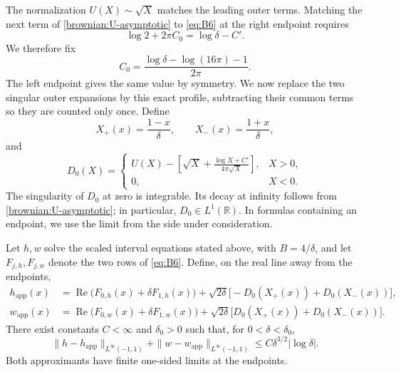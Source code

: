 The normalization $U(X)\sim\sqrt X$ matches the leading outer terms.
Matching the next term of \eqref{brownian:U-asymptotic} to
\eqref{eq:B6} at the right endpoint requires
\[
 \log2+2\pi C_0=\log\delta-C'.
\]
We therefore fix
\[
 C_0=\frac{\log\delta-\log(16\pi)-1}{2\pi}.
\]
The left endpoint gives the same value by symmetry.  We now replace the
two singular outer expansions by this exact profile, subtracting their
common terms so they are counted only once.  Define
\[
 X_+(x)=\frac{1-x}{\delta},\qquad
 X_-(x)=\frac{1+x}{\delta},
\]
and
\[
 D_0(X)=
 \begin{cases}
 U(X)-\displaystyle\left[\sqrt X+
              \frac{\log X+C'}{4\pi\sqrt X}\right],&X>0,\\[6pt]
 0,&X<0.
 \end{cases}
\]
The singularity of $D_0$ at zero is integrable.  Its decay at infinity
follows from \eqref{brownian:U-asymptotic}; in particular,
$D_0\in L^1(\mathbb R)$.  In formulas containing an endpoint,
we use the limit from the side under consideration.

\begin{lemma}\label{brownian:uniform}
Let $h,w$ solve the scaled interval equations stated above, with
$B=4/\delta$, and let $F_{j,h},F_{j,w}$ denote the two rows of
\eqref{eq:B6}.  Define, on the real line away from the endpoints,
\begin{align*}
 h_{\mathrm{app}}(x)
  &=\operatorname{Re}\bigl(F_{0,h}(x)+\delta F_{1,h}(x)\bigr)
    +\sqrt{2\delta}\bigl[-D_0(X_+(x))+D_0(X_-(x))\bigr],\\
 w_{\mathrm{app}}(x)
  &=\operatorname{Re}\bigl(F_{0,w}(x)+\delta F_{1,w}(x)\bigr)
    +\sqrt{2\delta}\bigl[D_0(X_+(x))+D_0(X_-(x))\bigr].
\end{align*}
There exist constants $C<\infty$ and $\delta_0>0$ such that, for
$0<\delta<\delta_0$,
\[
 \|h-h_{\mathrm{app}}\|_{L^\infty(-1,1)}
 +\|w-w_{\mathrm{app}}\|_{L^\infty(-1,1)}
 \le C\delta^{3/2}|\log\delta|.
\]
Both approximants have finite one-sided limits at the endpoints.
\end{lemma}


